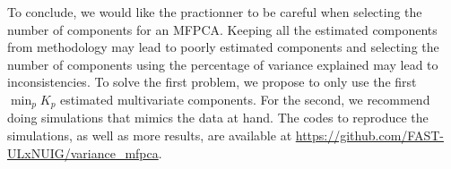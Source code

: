 To conclude, we would like the practionner to be careful when selecting the number of components for an MFPCA. Keeping all the estimated components from \cite{happMultivariateFunctionalPrincipal2018a} methodology may lead to poorly estimated components and selecting the number of components using the percentage of variance explained may lead to inconsistencies. To solve the first problem, we propose to only use the first $\min_p K_p$ estimated multivariate components. For the second, we recommend doing simulations that mimics the data at hand.
The codes to reproduce the simulations, as well as more results, are available at \url{https://github.com/FAST-ULxNUIG/variance_mfpca}.